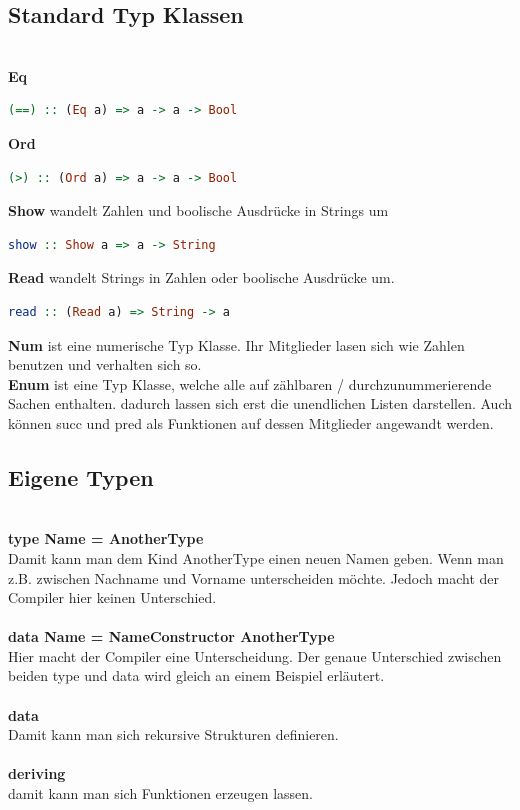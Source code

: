\subsection{Standard Typ Klassen}\qquad\\
\textbf{Eq} 
\begin{lstlisting}[language=Haskell]  
(==) :: (Eq a) => a -> a -> Bool  
\end{lstlisting}\qquad\newline
\textbf{Ord} 
\begin{lstlisting}[language=Haskell]  
(>) :: (Ord a) => a -> a -> Bool  
\end{lstlisting}\qquad\newline
\textbf{Show} wandelt Zahlen und boolische Ausdrücke in Strings um\
\begin{lstlisting}[language=Haskell]  
show :: Show a => a -> String 
\end{lstlisting}\qquad\newline
\textbf{Read} wandelt Strings in Zahlen oder boolische Ausdrücke um. 
\begin{lstlisting}[language=Haskell]  
read :: (Read a) => String -> a  
\end{lstlisting}\qquad\newline
\textbf{Num} ist eine numerische Typ Klasse. Ihr Mitglieder lasen sich wie Zahlen benutzen und verhalten sich so.\\
\textbf{Enum} ist eine Typ Klasse, welche alle auf zählbaren / durchzunummerierende Sachen enthalten. dadurch lassen sich erst die unendlichen Listen darstellen. Auch können succ und pred als Funktionen auf dessen Mitglieder angewandt werden.  

\subsection{Eigene Typen}\qquad\\
\textbf{type Name = AnotherType}\\ Damit kann man dem Kind AnotherType einen neuen Namen geben. Wenn man z.B. zwischen Nachname und Vorname unterscheiden möchte. Jedoch macht der Compiler hier keinen Unterschied. \\\qquad\\
\textbf{data Name = NameConstructor AnotherType}\\ Hier macht der Compiler eine Unterscheidung. Der genaue Unterschied zwischen beiden type und data wird gleich an einem Beispiel erläutert.  \\\qquad\\
\textbf{data} \\ Damit kann man sich rekursive Strukturen definieren.\\\qquad\\
\textbf{deriving}\\ damit kann man sich Funktionen erzeugen lassen. 


